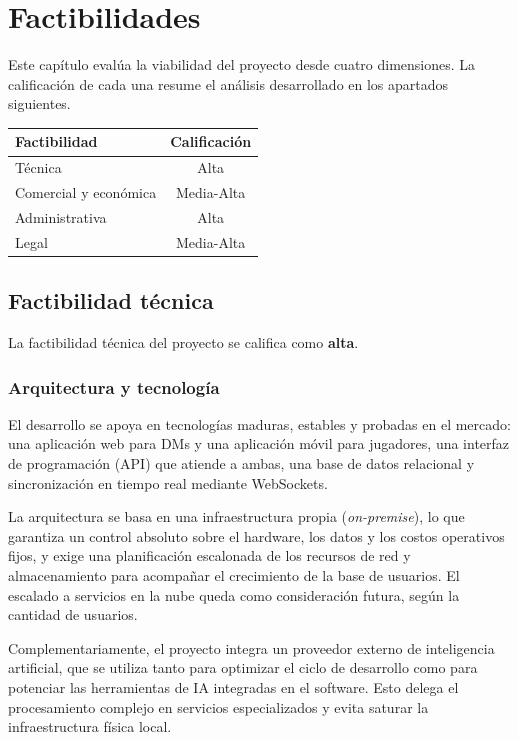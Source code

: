 \capredactadotrue
\section{Factibilidades}

Este capítulo evalúa la viabilidad del proyecto desde cuatro dimensiones. La calificación de cada una resume el análisis desarrollado en los apartados siguientes.

\begin{center}
\small
\begin{tabularx}{\textwidth}{|X|c|}
\hline
\textbf{Factibilidad} & \textbf{Calificación}\\ \hline
Técnica & Alta\\ \hline
Comercial y económica & Media-Alta\\ \hline
Administrativa & Alta\\ \hline
Legal & Media-Alta\\ \hline
\end{tabularx}
\end{center}

\subsection{Factibilidad técnica}
La factibilidad técnica del proyecto se califica como \textbf{alta}.

\subsubsection{Arquitectura y tecnología}
El desarrollo se apoya en tecnologías maduras, estables y probadas en el mercado: una aplicación web para DMs y una aplicación móvil para jugadores, una interfaz de programación (API) que atiende a ambas, una base de datos relacional y sincronización en tiempo real mediante WebSockets.

La arquitectura se basa en una infraestructura propia (\textit{on-premise}), lo que garantiza un control absoluto sobre el hardware, los datos y los costos operativos fijos, y exige una planificación escalonada de los recursos de red y almacenamiento para acompañar el crecimiento de la base de usuarios. El escalado a servicios en la nube queda como consideración futura, según la cantidad de usuarios.

Complementariamente, el proyecto integra un proveedor externo de inteligencia artificial, que se utiliza tanto para optimizar el ciclo de desarrollo como para potenciar las herramientas de IA integradas en el software. Esto delega el procesamiento complejo en servicios especializados y evita saturar la infraestructura física local.

